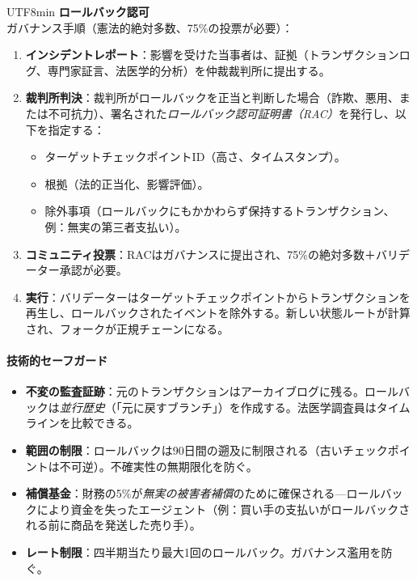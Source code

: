 \documentclass[11pt]{article}
\begin{document}
\begin{CJK}{UTF8}{min}
\textbf{ロールバック認可}\\
ガバナンス手順（憲法的絶対多数、75\%の投票が必要）：
\begin{enumerate}[noitemsep]
  \item \textbf{インシデントレポート}：影響を受けた当事者は、証拠（トランザクションログ、専門家証言、法医学的分析）を仲裁裁判所に提出する。
  \item \textbf{裁判所判決}：裁判所がロールバックを正当と判断した場合（詐欺、悪用、または不可抗力）、署名された\emph{ロールバック認可証明書（RAC）}を発行し、以下を指定する：
    \begin{itemize}[noitemsep]
      \item ターゲットチェックポイントID（高さ、タイムスタンプ）。
      \item 根拠（法的正当化、影響評価）。
      \item 除外事項（ロールバックにもかかわらず保持するトランザクション、例：無実の第三者支払い）。
    \end{itemize}
  \item \textbf{コミュニティ投票}：RACはガバナンスに提出され、75\%の絶対多数＋バリデーター承認が必要。
  \item \textbf{実行}：バリデーターはターゲットチェックポイントからトランザクションを再生し、ロールバックされたイベントを除外する。新しい状態ルートが計算され、フォークが正規チェーンになる。
\end{enumerate}

\paragraph{技術的セーフガード}
\begin{itemize}[noitemsep]
  \item \textbf{不変の監査証跡}：元のトランザクションはアーカイブログに残る。ロールバックは\emph{並行歴史}（「元に戻すブランチ」）を作成する。法医学調査員はタイムラインを比較できる。
  \item \textbf{範囲の制限}：ロールバックは90日間の遡及に制限される（古いチェックポイントは不可逆）。不確実性の無期限化を防ぐ。
  \item \textbf{補償基金}：財務の5\%が\emph{無実の被害者補償}のために確保される—ロールバックにより資金を失ったエージェント（例：買い手の支払いがロールバックされる前に商品を発送した売り手）。
  \item \textbf{レート制限}：四半期当たり最大1回のロールバック。ガバナンス濫用を防ぐ。
\end{itemize}


\end{CJK}
\end{document}
